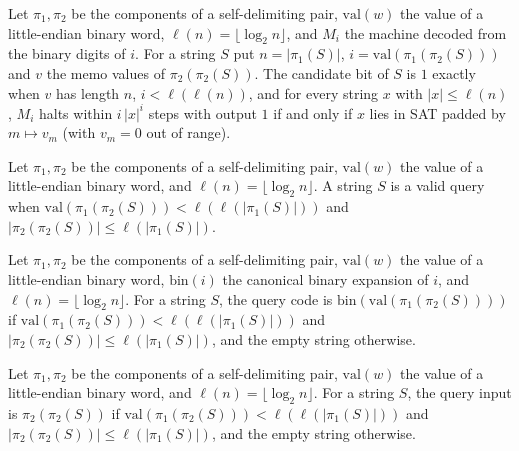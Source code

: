 \begin{definition}
\label{Complexity.ladner_candidate}
\leanok
{}
Let $\pi_1,\pi_2$ be the components of a self-delimiting pair, $\mathrm{val}(w)$ the value of
a little-endian binary word, $\ell(n)=\lfloor\log_2 n\rfloor$, and $M_i$ the machine decoded
from the binary digits of $i$. For a string $S$ put $n=|\pi_1(S)|$,
$i=\mathrm{val}(\pi_1(\pi_2(S)))$ and $v$ the memo values of $\pi_2(\pi_2(S))$. The candidate
bit of $S$ is $1$ exactly when $v$ has length $n$, $i<\ell(\ell(n))$, and for every string $x$
with $|x|\le\ell(n)$, $M_i$ halts within $i\,|x|^i$ steps with output $1$ if and only if $x$
lies in SAT padded by $m\mapsto v_m$ (with $v_m=0$ out of range).
\end{definition}

\begin{definition}
\label{Complexity.ladner_validQuery}
\leanok
{}
Let $\pi_1,\pi_2$ be the components of a self-delimiting pair, $\mathrm{val}(w)$ the value of
a little-endian binary word, and $\ell(n)=\lfloor\log_2 n\rfloor$. A string $S$ is a valid
query when $\mathrm{val}(\pi_1(\pi_2(S)))<\ell(\ell(|\pi_1(S)|))$ and
$|\pi_2(\pi_2(S))|\le\ell(|\pi_1(S)|)$.
\end{definition}

\begin{definition}
\label{Complexity.ladner_queryCode}
\leanok
{}
Let $\pi_1,\pi_2$ be the components of a self-delimiting pair, $\mathrm{val}(w)$ the value of
a little-endian binary word, $\mathrm{bin}(i)$ the canonical binary expansion of $i$, and
$\ell(n)=\lfloor\log_2 n\rfloor$. For a string $S$, the query code is
$\mathrm{bin}(\mathrm{val}(\pi_1(\pi_2(S))))$ if $\mathrm{val}(\pi_1(\pi_2(S)))<
\ell(\ell(|\pi_1(S)|))$ and $|\pi_2(\pi_2(S))|\le\ell(|\pi_1(S)|)$, and the empty string
otherwise.
\end{definition}

\begin{definition}
\label{Complexity.ladner_queryInput}
\leanok
{}
Let $\pi_1,\pi_2$ be the components of a self-delimiting pair, $\mathrm{val}(w)$ the value of
a little-endian binary word, and $\ell(n)=\lfloor\log_2 n\rfloor$. For a string $S$, the
query input is $\pi_2(\pi_2(S))$ if $\mathrm{val}(\pi_1(\pi_2(S)))<\ell(\ell(|\pi_1(S)|))$ and
$|\pi_2(\pi_2(S))|\le\ell(|\pi_1(S)|)$, and the empty string otherwise.
\end{definition}

